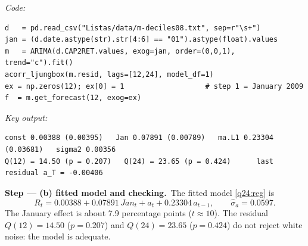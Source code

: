 \documentclass[11pt,a4paper]{article}
\newcommand{\passo}[2]{\par\smallskip\noindent\textbf{Step --- #1.}~#2}
\begin{document}
\begin{sol}
\noindent\textit{Code:}
\begingroup\footnotesize
\begin{verbatim}
d   = pd.read_csv("Listas/data/m-deciles08.txt", sep=r"\s+")
jan = (d.date.astype(str).str[4:6] == "01").astype(float).values
m   = ARIMA(d.CAP2RET.values, exog=jan, order=(0,0,1), trend="c").fit()
acorr_ljungbox(m.resid, lags=[12,24], model_df=1)
ex = np.zeros(12); ex[0] = 1                   # step 1 = January 2009
f  = m.get_forecast(12, exog=ex)
\end{verbatim}
\endgroup
\noindent\textit{Key output:}
\begingroup\footnotesize
\begin{verbatim}
const 0.00388 (0.00395)   Jan 0.07891 (0.00789)   ma.L1 0.23304 (0.03681)   sigma2 0.00356
Q(12) = 14.50 (p = 0.207)   Q(24) = 23.65 (p = 0.424)      last residual a_T = -0.00406
\end{verbatim}
\endgroup
\passo{(b) fitted model and checking}{The fitted model \eqref{q24:reg} is}
\begin{equation}\label{q24:fit} R_t = 0.00388 + 0.07891\,Jan_t + a_t + 0.23304\,a_{t-1},\qquad \hat\sigma_a=0.0597 . \end{equation}
The January effect is about 7.9 percentage points ($t\approx10$). The residual $Q(12)=14.50$ ($p=0.207$) and
$Q(24)=23.65$ ($p=0.424$) do not reject white noise: the model is adequate.


\end{sol}
\end{document}
